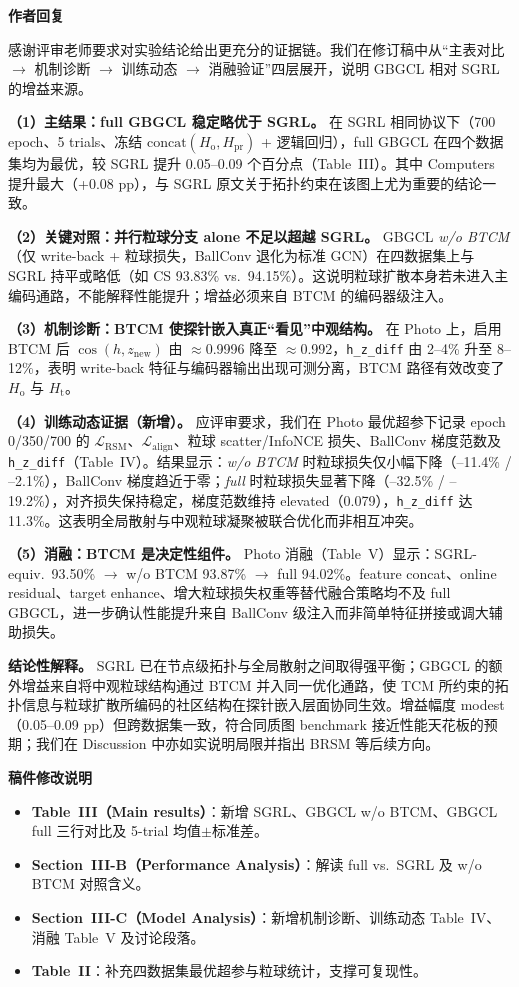 \documentclass[11pt,a4paper]{ctexart}
\newcommand{\AR}[1]{%
  \par\vspace{0.4em}\noindent\textbf{作者回复}\par
  #1\par}
\newcommand{\MC}[1]{%
  \par\vspace{0.4em}\noindent\textbf{稿件修改说明}\par
  #1\par}
\begin{document}
\AR{感谢评审老师要求对实验结论给出更充分的证据链。我们在修订稿中从``主表对比 $\rightarrow$ 机制诊断 $\rightarrow$ 训练动态 $\rightarrow$ 消融验证''四层展开，说明 GBGCL 相对 SGRL 的增益来源。

\textbf{（1）主结果：full GBGCL 稳定略优于 SGRL。}
在 SGRL 相同协议下（700 epoch、5 trials、冻结 $\mathrm{concat}(H_{\mathrm{o}},H_{\mathrm{pr}})$ + 逻辑回归），full GBGCL 在四个数据集均为最优，较 SGRL 提升 0.05--0.09 个百分点（Table~III）。其中 Computers 提升最大（+0.08 pp），与 SGRL 原文关于拓扑约束在该图上尤为重要的结论一致。

\textbf{（2）关键对照：并行粒球分支 alone 不足以超越 SGRL。}
GBGCL \emph{w/o BTCM}（仅 write-back + 粒球损失，BallConv 退化为标准 GCN）在四数据集上与 SGRL 持平或略低（如 CS 93.83\% vs.\ 94.15\%）。这说明粒球扩散本身若未进入主编码通路，不能解释性能提升；增益必须来自 BTCM 的编码器级注入。

\textbf{（3）机制诊断：BTCM 使探针嵌入真正``看见''中观结构。}
在 Photo 上，启用 BTCM 后 $\cos(h,z_{\mathrm{new}})$ 由 $\approx$0.9996 降至 $\approx$0.992，\texttt{h\_z\_diff} 由 2--4\% 升至 8--12\%，表明 write-back 特征与编码器输出出现可测分离，BTCM 路径有效改变了 $H_{\mathrm{o}}$ 与 $H_{\mathrm{t}}$。

\textbf{（4）训练动态证据（新增）。}
应评审要求，我们在 Photo 最优超参下记录 epoch 0/350/700 的 $\mathcal{L}_{\mathrm{RSM}}$、$\mathcal{L}_{\mathrm{align}}$、粒球 scatter/InfoNCE 损失、BallConv 梯度范数及 \texttt{h\_z\_diff}（Table~IV）。结果显示：\emph{w/o BTCM} 时粒球损失仅小幅下降（--11.4\% / --2.1\%），BallConv 梯度趋近于零；\emph{full} 时粒球损失显著下降（--32.5\% / --19.2\%），对齐损失保持稳定，梯度范数维持 elevated（0.079），\texttt{h\_z\_diff} 达 11.3\%。这表明全局散射与中观粒球凝聚被联合优化而非相互冲突。

\textbf{（5）消融：BTCM 是决定性组件。}
Photo 消融（Table~V）显示：SGRL-equiv.\ 93.50\% $\rightarrow$ w/o BTCM 93.87\% $\rightarrow$ full 94.02\%。feature concat、online residual、target enhance、增大粒球损失权重等替代融合策略均不及 full GBGCL，进一步确认性能提升来自 BallConv 级注入而非简单特征拼接或调大辅助损失。

\textbf{结论性解释。}
SGRL 已在节点级拓扑与全局散射之间取得强平衡；GBGCL 的额外增益来自将中观粒球结构通过 BTCM 并入同一优化通路，使 TCM 所约束的拓扑信息与粒球扩散所编码的社区结构在探针嵌入层面协同生效。增益幅度 modest（0.05--0.09 pp）但跨数据集一致，符合同质图 benchmark 接近性能天花板的预期；我们在 Discussion 中亦如实说明局限并指出 BRSM 等后续方向。}

\MC{%
\begin{itemize}
  \item \textbf{Table~III（Main results）}：新增 SGRL、GBGCL w/o BTCM、GBGCL full 三行对比及 5-trial 均值$\pm$标准差。
  \item \textbf{Section~III-B（Performance Analysis）}：解读 full vs.\ SGRL 及 w/o BTCM 对照含义。
  \item \textbf{Section~III-C（Model Analysis）}：新增机制诊断、训练动态 Table~IV、消融 Table~V 及讨论段落。
  \item \textbf{Table~II}：补充四数据集最优超参与粒球统计，支撑可复现性。
\end{itemize}
}
\end{document}
